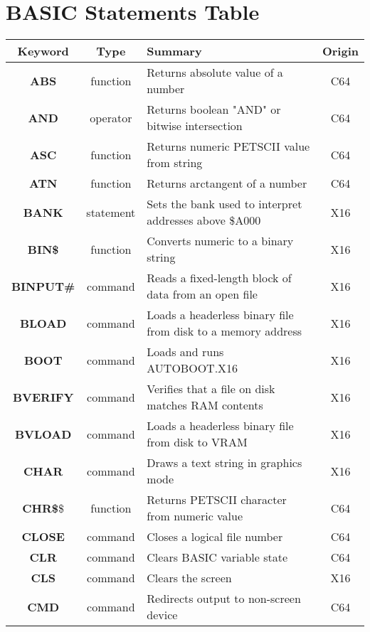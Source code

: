 \chapter*{BASIC Statements Table}

\begin{longtable}{|c|c|m{4cm}|c|}
	\hline
	Keyword & Type & Summary & Origin \\ \hline
	{\bfseries ABS} & function & Returns absolute value of a number & C64 \\ \hline
	{\bfseries AND} & operator & Returns boolean "AND" or bitwise intersection & C64 \\ \hline
	{\bfseries ASC} & function & Returns numeric PETSCII value from string & C64 \\ \hline
	{\bfseries ATN} & function & Returns arctangent of a number & C64 \\ \hline
	{\bfseries BANK} & statement & Sets the bank used to interpret addresses above \$A000 & X16 \\ \hline
	{\bfseries BIN\$} & function & Converts numeric to a binary string & X16 \\ \hline
	{\bfseries BINPUT\#} & command & Reads a fixed-length block of data from an open file & X16 \\ \hline
	{\bfseries BLOAD} & command & Loads a headerless binary file from disk to a memory address & X16 \\ \hline
	{\bfseries BOOT} & command & Loads and runs {\ttfamily AUTOBOOT.X16} & X16 \\ \hline
	{\bfseries BVERIFY} & command & Verifies that a file on disk matches RAM contents & X16 \\ \hline
	{\bfseries BVLOAD} & command & Loads a headerless binary file from disk to VRAM & X16 \\ \hline
	{\bfseries CHAR} & command & Draws a text string in graphics mode & X16 \\ \hline
	{\bfseries CHR\$}\$ & function & Returns PETSCII character from numeric value & C64 \\ \hline
	{\bfseries CLOSE} & command & Closes a logical file number & C64 \\ \hline
	{\bfseries CLR} & command & Clears BASIC variable state & C64 \\ \hline
	{\bfseries CLS} & command & Clears the screen & X16 \\ \hline
	{\bfseries CMD} & command & Redirects output to non-screen device & C64 \\ \hline

\end{longtable}
